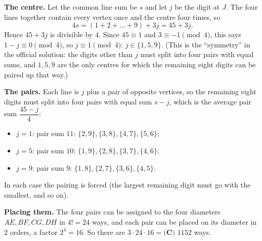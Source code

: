 \textbf{The centre.} Let the common line sum be $s$ and let $j$ be the digit at $J$. The four lines together contain every vertex once and the centre four times, so
\[
4s=(1+2+\dots+9)+3j=45+3j .
\]
Hence $45+3j$ is divisible by $4$. Since $45\equiv1$ and $3\equiv-1\pmod4$, this says $1-j\equiv0\pmod4$, so $j\equiv1\pmod4$: $j\in\{1,5,9\}$. (This is the ``symmetry'' in the official solution: the digits other than $j$ must split into four pairs with equal sums, and $1,5,9$ are the only centres for which the remaining eight digits can be paired up that way.)

\textbf{The pairs.} Each line is $j$ plus a pair of opposite vertices, so the remaining eight digits must split into four pairs with equal sum $s-j$, which is the average pair sum $\dfrac{45-j}{4}$:
\begin{itemize}
\item $j=1$: pair sum $11$: $\{2,9\},\{3,8\},\{4,7\},\{5,6\}$;
\item $j=5$: pair sum $10$: $\{1,9\},\{2,8\},\{3,7\},\{4,6\}$;
\item $j=9$: pair sum $9$: $\{1,8\},\{2,7\},\{3,6\},\{4,5\}$.
\end{itemize}
In each case the pairing is forced (the largest remaining digit must go with the smallest, and so on).

\textbf{Placing them.} The four pairs can be assigned to the four diameters $AE,BF,CG,DH$ in $4!=24$ ways, and each pair can be placed on its diameter in $2$ orders, a factor $2^4=16$. So there are $3\cdot24\cdot16=\boxed{\textbf{(C) }1152}$ ways.
